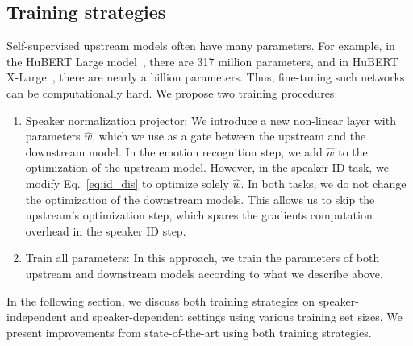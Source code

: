 \documentclass{article}
\renewcommand{\[}{\begin{eqnarray}}
\renewcommand{\]}{\end{eqnarray}}
\begin{document}
\subsection{Training strategies}\label{sec:strategies}

Self-supervised upstream models often have many parameters. For example, in the HuBERT Large model~\cite{hubert}, there are 317 million parameters, and in HuBERT X-Large~\cite{hubert}, there are nearly a billion parameters. Thus, fine-tuning such networks can be computationally hard. We propose two training procedures:
\begin{enumerate}
    \item Speaker normalization projector: We introduce a new non-linear layer with parameters $\widehat{w}$, which we use as a gate between the upstream and the downstream model. In the emotion recognition step, we add $\widehat{w}$ to the optimization of the upstream model. However, in the speaker ID task, we modify Eq.~\ref{eq:id_dis} to optimize solely $\widehat{w}$. In both tasks, we do not change the optimization of the downstream models. This allows us to skip the upstream's optimization step, which spares the gradients computation overhead in the speaker ID step.
    \item Train all parameters: In this approach, we train the parameters of both upstream and downstream models according to what we describe above. 
\end{enumerate}

In the following section, we discuss both training strategies on speaker-independent and speaker-dependent settings using various training set sizes. We present improvements from state-of-the-art using both training strategies.
\end{document}
